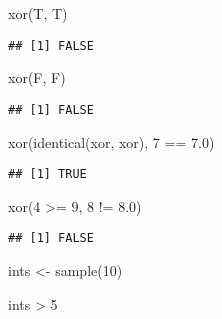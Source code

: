 \documentclass[
]{book}
\newenvironment{Shaded}{\begin{snugshade}}{\end{snugshade}}
\newcommand{\DecValTok}[1]{\textcolor[rgb]{0.00,0.00,0.81}{#1}}
\newcommand{\FloatTok}[1]{\textcolor[rgb]{0.00,0.00,0.81}{#1}}
\newcommand{\FunctionTok}[1]{\textcolor[rgb]{0.00,0.00,0.00}{#1}}
\newcommand{\NormalTok}[1]{#1}
\newcommand{\OtherTok}[1]{\textcolor[rgb]{0.56,0.35,0.01}{#1}}
\newcommand{\SpecialCharTok}[1]{\textcolor[rgb]{0.00,0.00,0.00}{#1}}
\newcommand{\StringTok}[1]{\textcolor[rgb]{0.31,0.60,0.02}{#1}}
\begin{document}
\begin{Shaded}
\begin{Highlighting}[]
\FunctionTok{xor}\NormalTok{(T, T)}
\end{Highlighting}
\end{Shaded}

\begin{verbatim}
## [1] FALSE
\end{verbatim}

\begin{Shaded}
\begin{Highlighting}[]
\FunctionTok{xor}\NormalTok{(F, F)}
\end{Highlighting}
\end{Shaded}

\begin{verbatim}
## [1] FALSE
\end{verbatim}

\begin{Shaded}
\begin{Highlighting}[]
\FunctionTok{xor}\NormalTok{(}\FunctionTok{identical}\NormalTok{(xor, }\StringTok{\textquotesingle{}xor\textquotesingle{}}\NormalTok{), }\DecValTok{7} \SpecialCharTok{==} \FloatTok{7.0}\NormalTok{)}
\end{Highlighting}
\end{Shaded}

\begin{verbatim}
## [1] TRUE
\end{verbatim}

\begin{Shaded}
\begin{Highlighting}[]
\FunctionTok{xor}\NormalTok{(}\DecValTok{4} \SpecialCharTok{\textgreater{}=} \DecValTok{9}\NormalTok{, }\DecValTok{8} \SpecialCharTok{!=} \FloatTok{8.0}\NormalTok{)}
\end{Highlighting}
\end{Shaded}

\begin{verbatim}
## [1] FALSE
\end{verbatim}

\begin{Shaded}
\begin{Highlighting}[]
\NormalTok{ints }\OtherTok{\textless{}{-}} \FunctionTok{sample}\NormalTok{(}\DecValTok{10}\NormalTok{)}
\end{Highlighting}
\end{Shaded}

\begin{Shaded}
\begin{Highlighting}[]
\NormalTok{ints }\SpecialCharTok{\textgreater{}} \DecValTok{5}
\end{Highlighting}
\end{Shaded}
\end{document}
